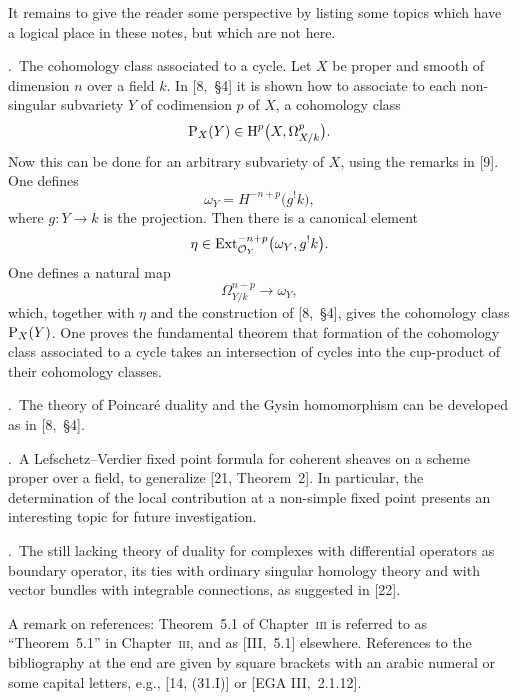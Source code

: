 It remains to give the reader some perspective by listing some topics which have a logical place in these notes, but which are not here.

\medskip
{}.\ The cohomology class associated to a cycle.
Let $X$ be proper and smooth of dimension $n$ over a field $k$. In [8,~\S4] it is shown how to associate to each non-singular subvariety $Y$ of codimension $p$ of $X$, a cohomology class
\[
\operatorname{P}_{X}(Y) \in \operatorname{H}^{p}\bigl(X, \Omega_{X/k}^{p}\bigr).
\]
Now this can be done for an arbitrary subvariety of $X$, using the remarks in [9]. One defines
\[
\omega_{Y} = H^{-n+p}\bigl(g^{!}k\bigr),
\]
where $g\colon Y\to k$ is the projection. Then there is a canonical element
\[
\eta \in \operatorname{Ext}_{\mathcal{O}_{Y}}^{-n+p}\bigl(\omega_{Y}, g^{!}k\bigr).
\]
One defines a natural map
\[
\Omega_{Y/k}^{n-p} \to \omega_{Y},
\]
which, together with $\eta$ and the construction of [8,~\S4], gives the cohomology class $\operatorname{P}_{X}(Y)$. One proves the fundamental theorem that formation of the cohomology class associated to a cycle takes an intersection of cycles into the cup-product of their cohomology classes.

\medskip
{}.\ The theory of Poincaré duality and the Gysin homomorphism can be developed as in [8,~\S4].

\medskip
{}.\ A Lefschetz–Verdier fixed point formula for coherent sheaves on a scheme proper over a field, to generalize [21, Theorem~2]. In particular, the determination of the local contribution at a non-simple fixed point presents an interesting topic for future investigation.

\medskip
{}.\ The still lacking theory of duality for complexes with differential operators as boundary operator, its ties with ordinary singular homology theory and with vector bundles with integrable connections, as suggested in [22].

\bigskip

A remark on references: Theorem~5.1 of Chapter~\textsc{iii} is referred to as ``Theorem~5.1'' in Chapter~\textsc{iii}, and as \textup{[III,~5.1]} elsewhere. References to the bibliography at the end are given by square brackets with an arabic numeral or some capital letters, e.g., \textup{[14, (31.I)]} or \textup{[EGA III,~2.1.12]}.
